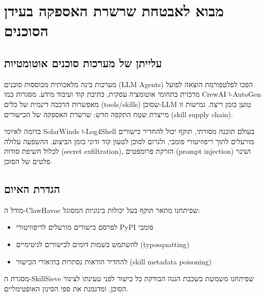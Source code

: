 
\clearpage
\chapter{מבוא לאבטחת שרשרת האספקה בעידן הסוכנים}

\section{עלייתן של מערכות סוכנים אוטומטיות}

מערכות בינה מלאכותית מבוססות סוכנים (\textenglish{LLM Agents}) הפכו לפלטפורמת הוצאה לפועל מרכזית בתחומי אוטומציה עסקית, כתיבת קוד ועיבוד מידע. מסגרות כמו \textenglish{CrewAI} \cite{hong2023metagpt} ו-\textenglish{AutoGen} \cite{wu2023autogen} מאפשרות הרכבה דינמית של כלים (\textenglish{tools/skills}) שסוכן-\textenglish{LLM} טוען בזמן ריצה. גמישות זו מייצרת שטח התקפה חדש: שרשרת האספקה של הכישורים (\textenglish{skill supply chain}).

בדומה לאיומי \textenglish{SolarWinds} ו-\textenglish{Log4Shell} בעולם תוכנה מסורתי, תוקף יכול להחדיר כישורים מורעלים לתוך ריפוזיטורי פומבי, ולגרום לסוכן לטעון קוד זדוני בזמן הביצוע. ההשפעה עלולה לכלול חשיפת סודות (\textenglish{secret exfiltration}), הזרקת פרומפטים (\textenglish{prompt injection}) \cite{perez2022ignore} ושינוי פלטים של הסוכן.

\section{הגדרת האיום}

מודל ה-\textenglish{ClawHavoc} שפיתחנו מתאר תוקף בעל יכולות בינוניות המסוגל:
\begin{itemize}
\item לפרסם כישורים מורעלים לריפוזיטורי \textenglish{PyPI} פומבי
\item להשתמש בשמות דומים לכישורים לגיטימיים (\textenglish{typosquatting})
\item להחדיר הוראות נסתרות בתיאורי הכישור (\textenglish{skill metadata poisoning})
\end{itemize}

מסגרת ה-\textenglish{SkillSieve} שפיתחנו \cite{nakash2024skillsieve} משמשת כשכבת הגנה הבודקת כל כישור לפני טעינתו לצינור הסוכן, ומדגמנת את ספי הסינון האופטימליים.
